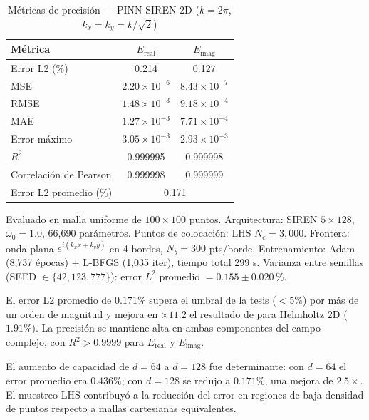 \begin{table}[htbp]
\centering
\begin{threeparttable}
\caption{Métricas de precisión --- PINN-SIREN 2D ($k = 2\pi$, $k_x = k_y = k/\sqrt{2}$)}
\label{tab:resultados2d}
\begin{tabular}{lcc}
\toprule
Métrica & $E_{\mathrm{real}}$ & $E_{\mathrm{imag}}$ \\
\midrule
Error L2 (\%)          & 0.214 & 0.127 \\
MSE                    & $2.20 \times 10^{-6}$ & $8.43 \times 10^{-7}$ \\
RMSE                   & $1.48 \times 10^{-3}$ & $9.18 \times 10^{-4}$ \\
MAE                    & $1.27 \times 10^{-3}$ & $7.71 \times 10^{-4}$ \\
Error máximo           & $3.05 \times 10^{-3}$ & $2.93 \times 10^{-3}$ \\
$R^2$                  & 0.999995 & 0.999998 \\
Correlación de Pearson & 0.999998 & 0.999999 \\
\midrule
Error L2 promedio (\%) & \multicolumn{2}{c}{0.171} \\
\bottomrule
\end{tabular}
\begin{tablenotes}
\small
\item Evaluado en malla uniforme de $100 \times 100$ puntos.
      Arquitectura: SIREN $5 \times 128$, $\omega_0 = 1.0$, 66{,}690 parámetros.
      Puntos de colocación: LHS $N_c = 3{,}000$.
      Frontera: onda plana $e^{i(k_x x + k_y y)}$ en 4 bordes, $N_b = 300$ pts/borde.
      Entrenamiento: Adam (8{,}737 épocas) + L-BFGS (1{,}035 iter), tiempo total 299 s.
      Varianza entre semillas (SEED $\in \{42, 123, 777\}$):
      error $L^2$ promedio $= 0.155 \pm 0.020$\,\%.
\end{tablenotes}
\end{threeparttable}
\end{table}

El error L2 promedio de $0.171\%$ supera el umbral de la tesis ($< 5\%$) por más de un
orden de magnitud y mejora en $\times 11.2$ el resultado de
\citet{Schoder2024_PINN_acoustics} para Helmholtz 2D ($1.91\%$).
La precisión se mantiene alta en ambas componentes del campo complejo, con $R^2 > 0.9999$
para $E_{\mathrm{real}}$ y $E_{\mathrm{imag}}$.

El aumento de capacidad de $d = 64$ a $d = 128$ fue determinante: con $d = 64$ el error
promedio era $0.436\%$; con $d = 128$ se redujo a $0.171\%$, una mejora de $2.5\times$.
El muestreo LHS contribuyó a la reducción del error en regiones de baja densidad de
puntos respecto a mallas cartesianas equivalentes.

